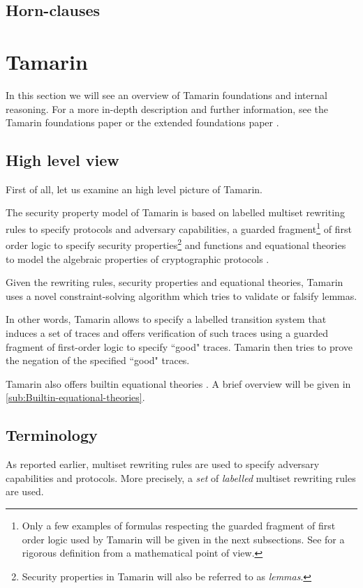 \subsection{Horn-clauses}

\section{Tamarin}
In this section we will see an overview of Tamarin foundations and internal reasoning.
For a more in-depth description and further information, see the Tamarin foundations paper \cite{TamarinFoundations} or the extended foundations paper \cite{TamarinFoundationsExtended}.

\subsection{High level view}
First of all, let us examine an high level picture of Tamarin.

The security property model of Tamarin is based on labelled multiset rewriting rules to specify protocols and adversary capabilities, a guarded fragment\footnote{Only a few examples of formulas respecting the guarded fragment of first order logic used by Tamarin will be given in the next subsections. See \cite{FragmentFirstOrderLogicPaper} for a rigorous definition from a mathematical point of view.} of first order logic to specify security properties\footnote{Security properties in Tamarin will also be referred to as \textit{lemmas}.} and functions and equational theories to model the algebraic properties of cryptographic protocols \cite{TamarinFoundations}.

Given the rewriting rules, security properties and equational theories, Tamarin uses a novel constraint-solving algorithm which tries to validate or falsify lemmas.

In other words, Tamarin allows to specify a labelled transition system that induces a set of traces and offers verification of such traces using a guarded fragment of first-order logic to specify ``good" traces. Tamarin then tries to prove the negation of the specified ``good" traces.

Tamarin also offers builtin equational theories \cite{TamarinProverManual}. A brief overview will be given in \cref{sub:Builtin-equational-theories}.

\subsection{Terminology}
As reported earlier, multiset rewriting rules are used to specify adversary capabilities and protocols. More precisely, a \textit{set} of \textit{labelled} multiset rewriting rules are used.

